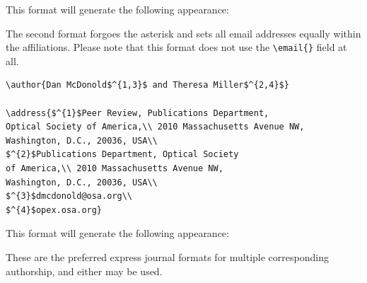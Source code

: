 \documentclass[10pt,letterpaper]{article}
\begin{document}
This format will generate the following appearance:

\author{Dan McDonold$^{1,3}$ and Theresa Miller$^{2,*}$}

\address{$^{1}$Peer Review, Publications Department, Optical Society of America,\\ 2010 Massachusetts Avenue NW, Washington, D.C., 20036, USA\\
$^{2}$Publications Department, Optical Society of America,\\ 2010 Massachusetts Avenue NW, Washington, D.C., 20036, USA\\
$^{3}$dmcdonold@osa.org}


The second format forgoes the asterisk and sets all email addresses equally within the affiliations. Please note that this format does not use the \verb+\email{}+ field at all.
\begin{verbatim}
\author{Dan McDonold$^{1,3}$ and Theresa Miller$^{2,4}$}

\address{$^{1}$Peer Review, Publications Department,
Optical Society of America,\\ 2010 Massachusetts Avenue NW,
Washington, D.C., 20036, USA\\
$^{2}$Publications Department, Optical Society
of America,\\ 2010 Massachusetts Avenue NW,
Washington, D.C., 20036, USA\\
$^{3}$dmcdonold@osa.org\\
$^{4}$opex.osa.org}
\end{verbatim}

This format will generate the following appearance:

\author{Dan McDonold$^{1,3}$ and Theresa Miller$^{2,4}$}

\address{$^{1}$Peer Review, Publications Department, Optical Society of America,\\ 2010 Massachusetts Avenue NW, Washington, D.C., 20036, USA\\
$^{2}$Publications Department, Optical Society of America,\\ 2010 Massachusetts Avenue NW, Washington, D.C., 20036, USA\\
$^{3}$dmcdonold@osa.org\\
$^{4}$opex.osa.org}

These are the preferred express journal formats for multiple corresponding authorship, and either may be used.
\end{document}
